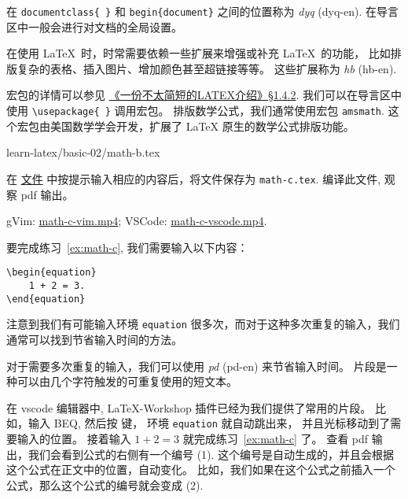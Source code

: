 \documentclass[
    11pt,
    base=hide,
    cite=authoryear,
    device=phone,
    lang=cn,
    mode=simple,
    result=answer,
    toc=onecol,
]{elegantbook_sierxue}
\begin{document}
\begin{latex}\label{tex:preamble}
    在 \lstinline|documentclass{ }| 和
    \lstinline|begin{document}| 之间的位置称为
    \emph{\gls{dyq}} (\gls{dyq-en}).
    在导言区中一般会进行对文档的全局设置。
\end{latex}
\begin{latex}\label{tex:package}
    在使用 \LaTeX\ 时，时常需要依赖一些扩展来增强或补充 \LaTeX\ 的功能，
    比如排版复杂的表格、插入图片、增加颜色甚至超链接等等。
    这些扩展称为
    \emph{\gls{hb}} (\gls{hb-en}).
\end{latex}
宏包的详情可以参见 \hyperlink{books/lshort-zh-cn.pdf.18}%
{《一份不太简短的LATEX介绍》\S1.4.2}.
我们可以在导言区中使用 \lstinline|\usepackage{ }| 调用宏包。
排版数学公式，我们通常使用宏包 \texttt{amsmath}.
这个宏包由美国数学学会开发，扩展了 {\LaTeX} 原生的数学公式排版功能。

%
{learn-latex/basic-02/math-b.tex}
\begin{exercise}\label{ex:math-c}
    在 \href{learn-latex/basic-02/math-b.tex}{文件}
    中按提示输入相应的内容后，将文件保存为 \texttt{math-c.tex}.
    编译此文件, 观察 pdf 输出。
\end{exercise}
\begin{cast}\label{cast:math-c}
    gVim: \href{media/casts/math-c.mp4}{math-c-vim.mp4};
    VSCode: \href{media/casts/math-c.mp4}{math-c-vscode.mp4}.
\end{cast}
要完成练习~\ref{ex:math-c}, 我们需要输入以下内容：
\begin{lstlisting}[style=lst]
\begin{equation}
    1 + 2 = 3.
\end{equation}
\end{lstlisting}
注意到我们有可能输入环境 \texttt{equation}
很多次，而对于这种多次重复的输入，我们通常可以找到节省输入时间的方法。
\begin{share}\label{share:snippets}
    对于需要多次重复的输入，我们可以使用
    \emph{\gls{pd}} (\gls{pd-en}) 来节省输入时间。
    片段是一种可以由几个字符触发的可重复使用的短文本。
\end{share}
在 vscode 编辑器中, LaTeX-Workshop 插件已经为我们提供了常用的片段。
比如，输入 BEQ, 然后按  键，
环境 \texttt{equation} 就自动跳出来，
并且光标移动到了需要输入的位置。
接着输入 \(1 + 2 = 3\) 就完成练习~\ref{ex:math-c} 了。
查看 pdf 输出，我们会看到公式的右侧有一个编号 (1).
这个编号是自动生成的，并且会根据这个公式在正文中的位置，自动变化。
比如，我们如果在这个公式之前插入一个公式，那么这个公式的编号就会变成 (2).
\end{document}
